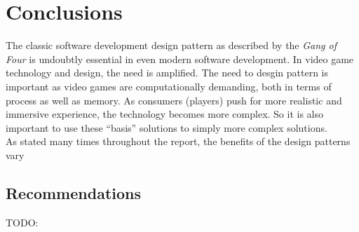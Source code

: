 \section{Conclusions}

The classic software development design pattern as described by the \textit{Gang of Four}\cite{gof} is undoubtly essential in even modern software development. In video game technology and design, the need is amplified. The need to desgin pattern is important as video games are computationally demanding, both in terms of process as well as memory. As consumers (players) push for more realistic and immersive experience, the technology becomes more complex. So it is also important to use these ``basis'' solutions to simply more complex solutions.\bs
\\
As stated many times throughout the report, the benefits of the design patterns vary 

\subsection{Recommendations}
TODO: